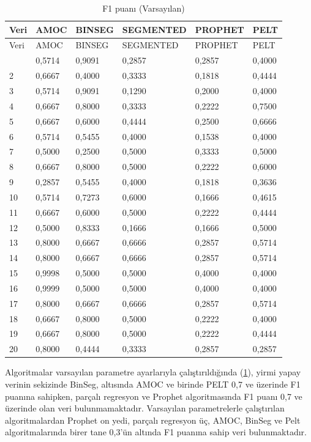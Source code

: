 \documentclass[12pt,twoside]{deuthesis}
\begin{document}
\begin{longtable}[]{@{}llllll@{}}
\caption{\label{tab:nvar8} F1 puanı (Varsayılan)}\tabularnewline
\toprule\noalign{}
Veri & AMOC & BINSEG & SEGMENTED & PROPHET & PELT \\
\midrule\noalign{}
\endfirsthead
\toprule\noalign{}
Veri & AMOC & BINSEG & SEGMENTED & PROPHET & PELT \\
\midrule\noalign{}
\endhead
\bottomrule\noalign{}
\endlastfoot
1 & 0,5714 & 0,9091 & 0,2857 & 0,2857 & 0,4000 \\
2 & 0,6667 & 0,4000 & 0,3333 & 0,1818 & 0,4444 \\
3 & 0,5714 & 0,9091 & 0,1290 & 0,2000 & 0,4000 \\
4 & 0,6667 & 0,8000 & 0,3333 & 0,2222 & 0,7500 \\
5 & 0,6667 & 0,6000 & 0,4444 & 0,2500 & 0,6666 \\
6 & 0,5714 & 0,5455 & 0,4000 & 0,1538 & 0,4000 \\
7 & 0,5000 & 0,2500 & 0,5000 & 0,3333 & 0,5000 \\
8 & 0,6667 & 0,8000 & 0,5000 & 0,2222 & 0,6000 \\
9 & 0,2857 & 0,5455 & 0,4000 & 0,1818 & 0,3636 \\
10 & 0,5714 & 0,7273 & 0,6000 & 0,1666 & 0,4615 \\
11 & 0,6667 & 0,6000 & 0,5000 & 0,2222 & 0,4444 \\
12 & 0,5000 & 0,8333 & 0,1666 & 0,1666 & 0,5000 \\
13 & 0,8000 & 0,6667 & 0,6666 & 0,2857 & 0,5714 \\
14 & 0,8000 & 0,6667 & 0,6666 & 0,2857 & 0,5714 \\
15 & 0,9998 & 0,5000 & 0,5000 & 0,4000 & 0,4000 \\
16 & 0,9999 & 0,5000 & 0,5000 & 0,4000 & 0,4000 \\
17 & 0,8000 & 0,6667 & 0,6666 & 0,2857 & 0,5714 \\
18 & 0,6667 & 0,8000 & 0,5000 & 0,2222 & 0,4000 \\
19 & 0,6667 & 0,8000 & 0,5000 & 0,2222 & 0,4444 \\
20 & 0,8000 & 0,4444 & 0,3333 & 0,2857 & 0,2857 \\
\end{longtable}

Algoritmalar varsayılan parametre ayarlarıyla çalıştırıldığında (\ref{tab:nvar8}), yirmi yapay verinin sekizinde BinSeg, altısında AMOC ve birinde PELT 0,7 ve üzerinde F1 puanına sahipken, parçalı regresyon ve Prophet algoritmasında F1 puanı 0,7 ve üzerinde olan veri bulunmamaktadır. Varsayılan parametrelerle çalıştırılan algoritmalardan Prophet on yedi, parçalı regresyon üç, AMOC, BinSeg ve Pelt algoritmalarında birer tane 0,3'ün altında F1 puanına sahip veri bulunmaktadır.
\end{document}

